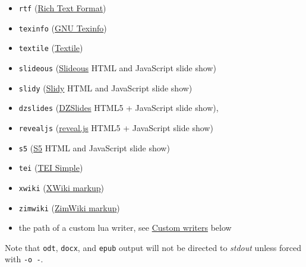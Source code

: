 \begin{description}
\begin{itemize}
\item
  \texttt{rtf}
  (\href{http://en.wikipedia.org/wiki/Rich_Text_Format}{Rich Text
  Format})
\item
  \texttt{texinfo} (\href{http://www.gnu.org/software/texinfo/}{GNU
  Texinfo})
\item
  \texttt{textile} (\href{http://redcloth.org/textile}{Textile})
\item
  \texttt{slideous}
  (\href{http://goessner.net/articles/slideous/}{Slideous} HTML and
  JavaScript slide show)
\item
  \texttt{slidy} (\href{http://www.w3.org/Talks/Tools/Slidy/}{Slidy}
  HTML and JavaScript slide show)
\item
  \texttt{dzslides} (\href{http://paulrouget.com/dzslides/}{DZSlides}
  HTML5 + JavaScript slide show),
\item
  \texttt{revealjs} (\href{http://lab.hakim.se/reveal-js/}{reveal.js}
  HTML5 + JavaScript slide show)
\item
  \texttt{s5} (\href{http://meyerweb.com/eric/tools/s5/}{S5} HTML and
  JavaScript slide show)
\item
  \texttt{tei} (\href{https://github.com/TEIC/TEI-Simple}{TEI Simple})
\item
  \texttt{xwiki}
  (\href{https://www.xwiki.org/xwiki/bin/view/Documentation/UserGuide/Features/XWikiSyntax/}{XWiki
  markup})
\item
  \texttt{zimwiki}
  (\href{http://zim-wiki.org/manual/Help/Wiki_Syntax.html}{ZimWiki
  markup})
\item
  the path of a custom lua writer, see
  \protect\hyperlink{custom-writers}{Custom writers} below
\end{itemize}

Note that \texttt{odt}, \texttt{docx}, and \texttt{epub} output will not
be directed to \emph{stdout} unless forced with \texttt{-o\ -}.


\end{description}
